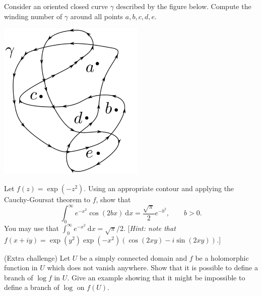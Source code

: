 \documentclass[answers]{exam}
\begin{document}
\begin{questions}
\question%
Consider an oriented closed curve $\gamma$ described by the figure below. Compute the winding number of $\gamma$ around all points $a,b,c,d,e$.
\begin{center}\includegraphics[width=7cm]{sheet 2 q 8}\end{center}



\question%
Let $f(z)=\exp(-z^2)$. Using an appropriate contour and applying the Cauchy-Goursat theorem to $f$, show that \[
	\int_0^\infty e^{-x^2}\cos(2bx)\mathrm{~d}x=\frac{\sqrt\pi}2e^{-b^2},\qquad b>0.
\] You may use that $\int_0^\infty e^{-x^2}\mathrm{~d}x=\sqrt\pi/2$. [\emph{Hint: note that $f(x+iy)=\exp(y^2)\exp(-x^2)(\cos(2xy)-i\sin(2xy))$.}]



\question%
(Extra challenge) Let $U$ be a simply connected domain and $f$ be a holomorphic function in $U$ which does not vanish anywhere. Show that it is possible to define a branch of $\log f$ in $U$. Give an example showing that it might be impossible to define a branch of $\log$ on $f(U)$.

\end{questions}
\end{document}
